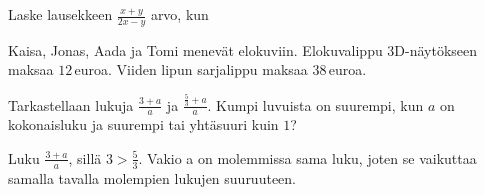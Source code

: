 \begin{tehtavasivu}
\begin{tehtava} 
            \begin{vastaus}		
            \end{vastaus}
\end{tehtava}
        
\begin{tehtava}
	\begin{vastaus}
	\end{vastaus}
\end{tehtava}

\begin{tehtava}
Laske lausekkeen $\frac{x+y}{2x-y}$ arvo, kun
	\begin{vastaus}
	\end{vastaus}
\end{tehtava}

\begin{tehtava} %
Kaisa, Jonas, Aada ja Tomi menevät elokuviin. Elokuvalippu 3D-näytökseen maksaa $12$\,euroa. Viiden lipun sarjalippu maksaa $38$\,euroa.
	\begin{vastaus}
	\end{vastaus}
\end{tehtava}
    
\begin{tehtava}
 Tarkastellaan lukuja $\frac{3+a}{a}$ ja $\frac{\frac{5}{3}+a}{a}$. Kumpi luvuista on suurempi, kun $a$ on kokonaisluku ja suurempi tai yhtäsuuri kuin $1$?
 \begin{vastaus}
  Luku $\frac{3+a}{a}$, sillä $3>\frac{5}{3}$. Vakio a on molemmissa sama luku, joten se vaikuttaa samalla tavalla molempien lukujen suuruuteen.
 \end{vastaus}
\end{tehtava}


\end{tehtavasivu}

